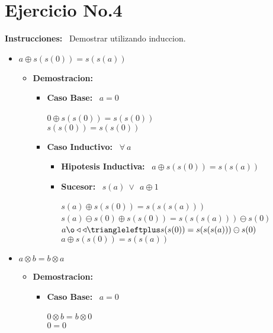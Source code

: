 \documentclass[10pt,a4paper]{article}
\begin{document}
\section*{Ejercicio No.4}
\begin{flushleft}
\textbf{Instrucciones: } \ Demostrar utilizando induccion.
\end{flushleft}
\begin{itemize}
        \item{$a\oplus s(s(0))=s(s(a))$}
        \begin{itemize}
        \item \textbf{Demostracion: }
        \begin{itemize}
        \item \textbf{Caso Base: } \ $ a = 0 $
        \begin{center}
        $0\oplus s(s(0))=s(s(0))$
        \
        \\$ s(s(0))=s(s(0))$
        
        \end{center}
        \item \textbf{Caso Inductivo: } \ $ \forall\ a$
        \begin{itemize}
        \item \textbf{Hipotesis Inductiva: } \ $a\oplus s(s(0))=s(s(a))$
        \item \textbf{Sucesor: } \ $ s(a) \ \vee \ \ a\oplus 1 $
        \begin{center}
        $s(a)\oplus s(s(0)) = s(s(s(a))) $
        \
        \\ $s(a)\ominus s(0)\oplus s(s(0)) = s(s(s(a)))\ominus s(0) $
        \
        \\$ a\o\triangleleft\triangleleft\triangleleftplus s(s(0)) = s(s(s(a)))\ominus s(0) $
        \
        \\ $a\oplus s(s(0))=s(s(a))$
        \end{center}
        \end{itemize}
        \end{itemize}
        \end{itemize}
        \item{$a \otimes b = b \otimes a$}
        \begin{itemize}
        \item \textbf{Demostracion: }
        \begin{itemize}
        \item \textbf{Caso Base: } \ $ a = 0$
        \begin{center}
        $0\otimes b = b\otimes 0$
        \
        \\
        $ 0 = 0$
       

\end{center}
\end{itemize}
\end{itemize}
\end{itemize}
\end{document}
